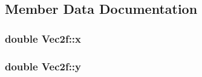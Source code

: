 \subsection{Member Data Documentation}
\subsubsection[{\texorpdfstring{x}{x}}]{\setlength{\rightskip}{0pt plus 5cm}double Vec2f::x}\hypertarget{class_vec2f_aae649f38fb692202ed76dd1783c02d1f}{}\label{class_vec2f_aae649f38fb692202ed76dd1783c02d1f}
\subsubsection[{\texorpdfstring{y}{y}}]{\setlength{\rightskip}{0pt plus 5cm}double Vec2f::y}\hypertarget{class_vec2f_a6215e122ad762df0beb90949f8e1859a}{}\label{class_vec2f_a6215e122ad762df0beb90949f8e1859a}
